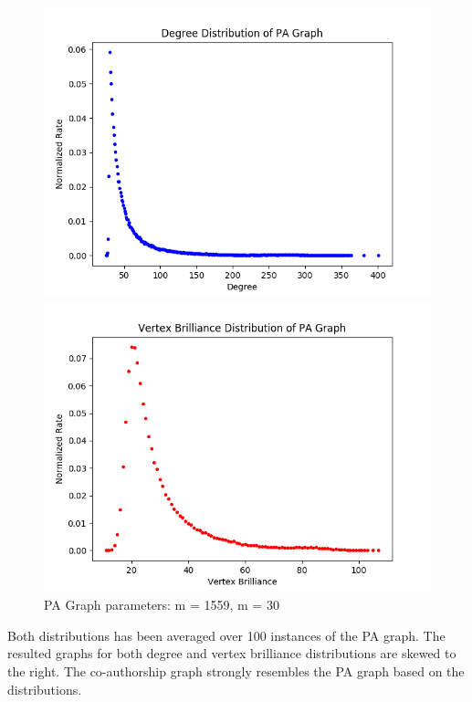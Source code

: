\documentclass[11pt,a4paper,notitlepage]{article}
\begin{document}
\begin{figure}[H]
    \centering
    \begin{minipage}{0.49\textwidth}
        \centering
        \includegraphics[width=1\textwidth]{pa_graph-1559-30-degree.png}
    \end{minipage}
    \begin{minipage}{0.49\textwidth}
        \centering
        \includegraphics[width=1\textwidth]{pa_graph-1559-30-brilliance.png}
    \end{minipage} \hfill
    \caption{PA Graph parameters: m = 1559, m = 30}
\end{figure}
Both distributions has been averaged over 100 instances of the PA graph. The resulted graphs for both degree and vertex brilliance distributions are skewed to the right. The co-authorship graph strongly resembles the PA graph based on the distributions. 
\end{document}
